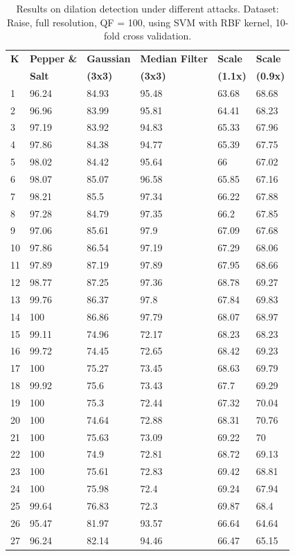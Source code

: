 \documentclass[review]{elsarticle}
\begin{document}
\begin{longtable}{C{1.5cm}|C{1.5cm}C{1.5cm}C{1.5cm}C{1.5cm}C{1.5cm}}
	\caption{Results on dilation detection under different attacks. Dataset: Raise, full resolution, QF = 100, using SVM with RBF kernel, 10-fold cross validation.}
	\label{table:attacks1}\\
	\hline\hline
	\textbf{K} & \textbf{Pepper \&}&\textbf{Gaussian }&\textbf{Median Filter}&\textbf{Scale}&\textbf{Scale}\\
	& \textbf{Salt}&\textbf{(3x3)}&\textbf{(3x3)}&\textbf{(1.1x)}&\textbf{(0.9x)}\\
	&96.24&84.93&95.48&63.68&68.68\\
	2&96.96&83.99&95.81&64.41&68.23\\
	3&97.19&83.92&94.83&65.33&67.96\\
	4&97.86&84.38&94.77&65.39&67.75\\
	5&98.02&84.42&95.64&66&67.02\\
	6&98.07&85.07&96.58&65.85&67.16\\
	7&98.21&85.5&97.34&66.22&67.88\\
	8&97.28&84.79&97.35&66.2&67.85\\
	9&97.06&85.61&97.9&67.09&67.68\\
	10&97.86&86.54&97.19&67.29&68.06\\
	11&97.89&87.19&97.89&67.95&68.66\\
	12&98.77&87.25&97.36&68.78&69.27\\
	13&99.76&86.37&97.8&67.84&69.83\\
	14&100&86.86&97.79&68.07&68.97\\
	15&99.11&74.96&72.17&68.23&68.23\\
	16&99.72&74.45&72.65&68.42&69.23\\
	17&100&75.27&73.45&68.63&69.79\\
	18&99.92&75.6&73.43&67.7&69.29\\
	19&100&75.3&72.44&67.32&70.04\\
	20&100&74.64&72.88&68.31&70.76\\
	21&100&75.63&73.09&69.22&70\\
	22&100&74.9&72.81&68.72&69.13\\
	23&100&75.61&72.83&69.42&68.81\\
	24&100&75.98&72.4&69.24&67.94\\
	25&99.64&76.83&72.3&69.87&68.4\\
	26&95.47&81.97&93.57&66.64&64.64\\
	27&96.24&82.14&94.46&66.47&65.15\\

\end{longtable}
\end{document}
